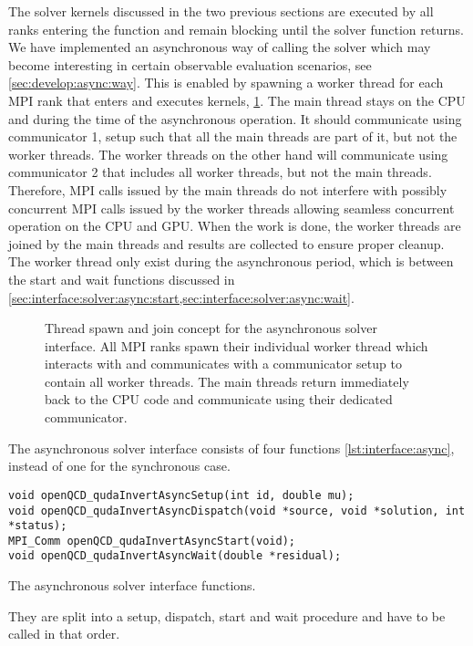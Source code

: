 The solver kernels discussed in the two previous sections are executed by all ranks entering the function and remain blocking until the solver function returns.
We have implemented an asynchronous way of calling the solver which may become interesting in certain observable evaluation scenarios, see \cref{sec:develop:async:way}.
This is enabled by spawning a worker thread for each MPI rank that enters \quda and executes kernels, \cref{fig:interface:async}.
The main thread stays on the CPU and during the time of the asynchronous operation.
It should communicate using communicator \num{1}, setup such that all the main threads are part of it, but not the worker threads.
The worker threads on the other hand will communicate using communicator \num{2} that includes all worker threads, but not the main threads.
Therefore, MPI calls issued by the main threads do not interfere with possibly concurrent MPI calls issued by the worker threads allowing seamless concurrent operation on the CPU and GPU.
When the work is done, the worker threads are joined by the main threads and results are collected to ensure proper cleanup.
The worker thread only exist during the asynchronous period, which is between the start and wait functions discussed in \cref{sec:interface:solver:async:start,sec:interface:solver:async:wait}.
\begin{figure}
  
  \caption{Thread spawn and join concept for the asynchronous solver interface. All MPI ranks spawn their individual worker thread which interacts with \quda and communicates with a communicator setup to contain all worker threads. The main threads return immediately back to the CPU code and communicate using their dedicated communicator.}
  \label{fig:interface:async}
\end{figure}

The asynchronous solver interface consists of four functions \cref{lst:interface:async}, instead of one for the synchronous case.
\begin{codelisting}
\begin{verbatim}
void openQCD_qudaInvertAsyncSetup(int id, double mu);
void openQCD_qudaInvertAsyncDispatch(void *source, void *solution, int *status);
MPI_Comm openQCD_qudaInvertAsyncStart(void);
void openQCD_qudaInvertAsyncWait(double *residual);
\end{verbatim}
\caption{The asynchronous solver interface functions.}
\label{lst:interface:async}
\end{codelisting}
They are split into a setup, dispatch, start and wait procedure and have to be called in that order.

